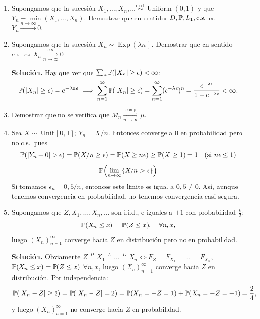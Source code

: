 \begin{enumerate}
  \item Supongamos que la sucesión $X_1, \dots, X_n, \dots \stackrel{\text{i.i.d.}}{\sim} \operatorname{Uniform}(0,1)$ y que $Y_n = \min(X_1, \dots, X_n)$. Demostrar que en sentidos $D, \mathbb{P}, L_1, \text{c.s.}$ es $Y_n \xrightarrow{n\to\infty} 0$.

  \item Supongamos que la sucesión $X_n \sim \operatorname{Exp}(\lambda n)$. Demostrar que en sentido c.s.\ es $X_n \xrightarrow[n\to\infty]{\text{c.s.}} 0$.

  \textbf{Solución.} Hay que ver que $\sum_n \mathbb{P}(|X_n| \ge \epsilon) < \infty$:
  \[
    \mathbb{P}(|X_n| \ge \epsilon) = e^{-\lambda n \epsilon} \implies \sum_{n=1}^\infty \mathbb{P}(|X_n| \ge \epsilon) = \sum_{n=1}^\infty (e^{-\lambda \epsilon})^n = \frac{e^{-\lambda\epsilon}}{1 - e^{-\lambda\epsilon}} < \infty.
  \]

  \item Demostrar que no se verifica que $M_n \xrightarrow[n\to\infty]{\text{comp}} \mu$.

  \item Sea $X \sim \operatorname{Unif}[0,1]$; $Y_n = X/n$. Entonces converge a $0$ en probabilidad pero no c.s.\ pues
        \[
          \mathbb{P}(|Y_n - 0| > \epsilon) = \mathbb{P}(X/n \ge \epsilon) = \mathbb{P}(X \ge n\epsilon) \ge \mathbb{P}(X \ge 1) = 1 \quad (\text{si } n\epsilon \le 1)\]
          \[ \mathbb{P}\!\left(\lim_{n\to\infty} \{X/n > \epsilon\}\right)
        \]
        Si tomamos $\epsilon_n = 0{,}5/n$, entonces este límite es igual a $0{,}5 \neq 0$. Así, aunque tenemos convergencia en probabilidad, no tenemos convergencia casi segura.

  \item Supongamos que $Z, X_1, \dots, X_n, \dots$ son i.i.d., e iguales a $\pm 1$ con probabilidad $\frac{k}{2}$:
        \[
          \mathbb{P}(X_n \le x) = \mathbb{P}(Z \le x), \quad \forall n, x,
        \]
        luego $(X_n)_{n=1}^\infty$ converge hacia $Z$ en distribución pero no en probabilidad.

  \textbf{Solución.} Obviamente $Z \stackrel{D}{=} X_1 \stackrel{D}{=} \dots \stackrel{D}{=} X_n \iff F_Z = F_{X_1} = \dots = F_{X_n}$, $\mathbb{P}(X_n \le x) = \mathbb{P}(Z \le x)$ $\forall n, x$, luego $(X_n)_{n=1}^\infty$ converge hacia $Z$ en distribución. Por independencia:
  \[
    \mathbb{P}(|X_n - Z| \ge 2) = \mathbb{P}(|X_n - Z| = 2) = \mathbb{P}(X_n = -Z = 1) + \mathbb{P}(X_n = -Z = -1) = \frac{2}{4},
  \]
  y luego $(X_n)_{n=1}^\infty$ no converge hacia $Z$ en probabilidad.
\end{enumerate}

